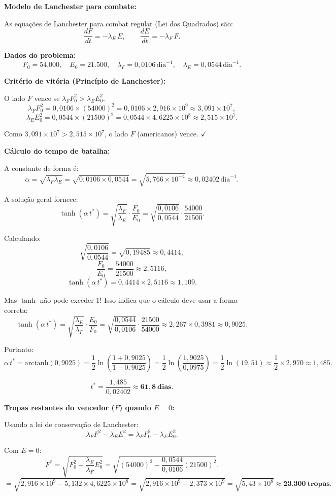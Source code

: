 \textbf{Modelo de Lanchester para combate:}

As equações de Lanchester para combat regular (Lei dos Quadrados) são:
\[
\frac{dF}{dt} = -\lambda_E\,E,\qquad \frac{dE}{dt} = -\lambda_F\,F.
\]

\textbf{Dados do problema:}
\[
F_0=54{.}000,\quad E_0=21{.}500,\quad \lambda_F=0{,}0106\,\text{dia}^{-1},\quad \lambda_E=0{,}0544\,\text{dia}^{-1}.
\]

\textbf{Critério de vitória (Princípio de Lanchester):}

O lado $F$ vence se $\lambda_F F_0^2 > \lambda_E E_0^2$.
\[
\lambda_F F_0^2 = 0{,}0106\times(54000)^2 = 0{,}0106\times2{,}916\times10^9 \approx 3{,}091\times10^7,
\]
\[
\lambda_E E_0^2 = 0{,}0544\times(21500)^2 = 0{,}0544\times4{,}6225\times10^8 \approx 2{,}515\times10^7.
\]

Como $3{,}091\times10^7 > 2{,}515\times10^7$, o lado $F$ (americanos) vence. $\checkmark$

\textbf{Cálculo do tempo de batalha:}

A constante de forma é:
\[
\alpha = \sqrt{\lambda_F\lambda_E} = \sqrt{0{,}0106\times0{,}0544} = \sqrt{5{,}766\times10^{-4}} \approx 0{,}02402\,\text{dia}^{-1}.
\]

A solução geral fornece:
\[
\tanh(\alpha\,t^*) = \sqrt{\frac{\lambda_F}{\lambda_E}}\cdot\frac{F_0}{E_0} = \sqrt{\frac{0{,}0106}{0{,}0544}}\cdot\frac{54000}{21500}.
\]

Calculando:
\[
\sqrt{\frac{0{,}0106}{0{,}0544}} = \sqrt{0{,}19485} \approx 0{,}4414,
\]
\[
\frac{F_0}{E_0}=\frac{54000}{21500}\approx2{,}5116,
\]
\[
\tanh(\alpha\,t^*)=0{,}4414\times2{,}5116\approx1{,}109.
\]

Mas $\tanh$ não pode exceder 1! Isso indica que o cálculo deve usar a forma correta:
\[
\tanh(\alpha\,t^*) = \sqrt{\frac{\lambda_E}{\lambda_F}}\cdot\frac{E_0}{F_0} = \sqrt{\frac{0{,}0544}{0{,}0106}}\cdot\frac{21500}{54000}\approx2{,}267\times0{,}3981\approx0{,}9025.
\]

Portanto:
\[
\alpha\,t^* = \text{arctanh}(0{,}9025) = \frac{1}{2}\ln\left(\frac{1+0{,}9025}{1-0{,}9025}\right)=\frac{1}{2}\ln\left(\frac{1{,}9025}{0{,}0975}\right)=\frac{1}{2}\ln(19{,}51)\approx\frac{1}{2}\times2{,}970\approx1{,}485.
\]

\[
t^*=\frac{1{,}485}{0{,}02402}\approx\mathbf{61{,}8\ \text{dias}}.
\]

\textbf{Tropas restantes do vencedor ($F$) quando $E=0$:}

Usando a lei de conservação de Lanchester:
\[
\lambda_F F^2 - \lambda_E E^2 = \lambda_F F_0^2 - \lambda_E E_0^2.
\]

Com $E=0$:
\[
F^* = \sqrt{F_0^2 - \frac{\lambda_E}{\lambda_F}E_0^2} = \sqrt{(54000)^2 - \frac{0{,}0544}{0{,}0106}(21500)^2}.
\]
\[
= \sqrt{2{,}916\times10^9 - 5{,}132\times\!4{,}6225\times10^8} = \sqrt{2{,}916\times10^9 - 2{,}373\times10^9}
= \sqrt{5{,}43\times10^8}\approx\mathbf{23{.}300\ \text{tropas}}.
\] 